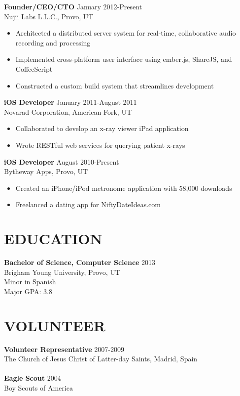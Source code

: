 \documentclass[margin]{res}
\begin{document}
\begin{resume}
      {\bf Founder/CEO/CTO} \hfill January 2012-Present \\
      Nujii Labs L.L.C., Provo, UT 
      \begin{itemize} \itemsep -2pt
        \item Architected a distributed server system for real-time, 
        collaborative audio recording and processing
        \item Implemented cross-platform user interface using ember.js, ShareJS,
        and CoffeeScript
        \item Constructed a custom build system that streamlines development
      \end{itemize}

      {\bf iOS Developer} \hfill January 2011-August 2011 \\
      Novarad Corporation, American Fork, UT  
      \begin{itemize} \itemsep -2pt
        \item Collaborated to develop an x-ray viewer iPad application
        \item Wrote RESTful web services for querying patient x-rays
      \end{itemize}

      {\bf iOS Developer} \hfill  August 2010-Present \\
      Bytheway Apps, Provo, UT
      \begin{itemize} \itemsep -2pt
        \item Created an iPhone/iPod metronome application with 58,000 downloads
        \item Freelanced a dating app for NiftyDateIdeas.com
      \end{itemize}

    \section{EDUCATION}
      {\bf Bachelor of Science, Computer Science} \hfill 2013 \\
      Brigham Young University, Provo, UT                 \\
      Minor in Spanish                                    \\
      Major GPA: 3.8

    \section{VOLUNTEER}
      {\bf Volunteer Representative} \hfill 2007-2009 \\
      The Church of Jesus Christ of Latter-day Saints, Madrid, Spain \\ \\
      {\bf Eagle Scout} \hfill 2004 \\
      Boy Scouts of America


\end{resume}
\end{document}
